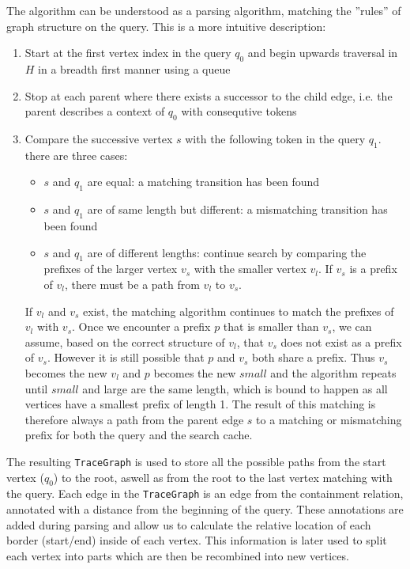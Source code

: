 The algorithm can be understood as a parsing algorithm, matching the ''rules'' of graph structure on the query. This is a more intuitive description:
\begin{enumerate}
    \item Start at the first vertex index in the query $q_0$ and begin upwards traversal in $H$ in a breadth first manner using a queue
    \item Stop at each parent where there exists a successor to the child edge, i.e. the parent describes a context of $q_0$ with consequtive tokens
    \item Compare the successive vertex $s$ with the following token in the query $q_1$. there are three cases:
    \begin{itemize}
        \item $s$ and $q_1$ are equal: a matching transition has been found
        \item $s$ and $q_1$ are of same length but different: a mismatching transition has been found
        \item $s$ and $q_1$ are of different lengths: continue search by comparing the prefixes of the larger vertex $v_s$ with the smaller vertex $v_l$. If $v_s$ is a prefix of $v_l$, there must be a path from $v_l$ to $v_s$.  
    \end{itemize}
    If $v_l$ and $v_s$ exist, the matching algorithm continues to match the prefixes of $v_l$ with $v_s$.
    Once we encounter a prefix $p$ that is smaller than $v_s$, we can assume, based on the correct structure of $v_l$, that $v_s$ does not exist as a prefix of $v_s$. However it is still possible that $p$ and $v_s$ both share a prefix. Thus $v_s$ becomes the new $v_l$ and $p$ becomes the new $small$ and the algorithm repeats until $small$ and large are the same length, which is bound to happen as all vertices have a smallest prefix of length 1.
    The result of this matching is therefore always a path from the parent edge $s$ to a matching or mismatching prefix for both the query and the search cache.
\end{enumerate}

The resulting \texttt{TraceGraph} is used to store all the possible paths from the start vertex ($q_0$) to the root, aswell as from the root to the last vertex matching with the query. Each edge in the \texttt{TraceGraph} is an edge from the containment relation, annotated with a distance from the beginning of the query. These annotations are added during parsing and allow us to calculate the relative location of each border (start/end) inside of each vertex. This information is later used to split each vertex into parts which are then be recombined into new vertices.
